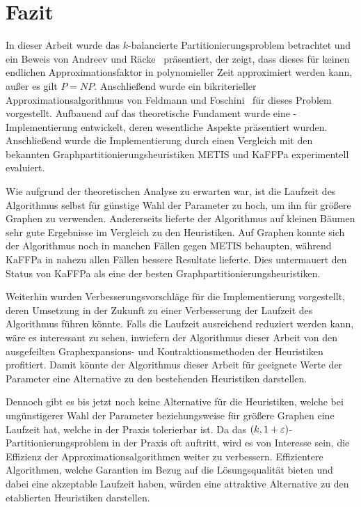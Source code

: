 
\chapter{Fazit}\label{chapter:fazit}
In dieser Arbeit wurde das $k$\hyp balancierte Partitionierungsproblem betrachtet und ein Beweis von Andreev und Räcke~\cite{ar06} präsentiert, der zeigt, dass dieses für keinen endlichen Approximationsfaktor in polynomieller Zeit approximiert werden kann, außer es gilt $P=NP$.
Anschließend wurde ein bikriterieller Approximationsalgorithmus von Feldmann und Foschini~\cite{FF15} für dieses Problem vorgestellt.
Aufbauend auf das theoretische Fundament wurde eine \Cpp{}\hyp Implementierung entwickelt, deren wesentliche Aspekte präsentiert wurden.
Anschließend wurde die Implementierung durch einen Vergleich mit den bekannten Graphpartitionierungsheuristiken METIS und KaFFPa experimentell evaluiert.

Wie aufgrund der theoretischen Analyse zu erwarten war, ist die Laufzeit des Algorithmus selbst für günstige Wahl der Parameter zu hoch, um ihn für größere Graphen zu verwenden.
Andererseits lieferte der Algorithmus auf kleinen Bäumen sehr gute Ergebnisse im Vergleich zu den Heuristiken.
Auf Graphen konnte sich der Algorithmus noch in manchen Fällen gegen METIS behaupten, während KaFFPa in nahezu allen Fällen bessere Resultate lieferte.
Dies untermauert den Status von KaFFPa als eine der besten Graphpartitionierungsheuristiken.

Weiterhin wurden Verbesserungsvorschläge für die Implementierung vorgestellt, deren Umsetzung in der Zukunft zu einer Verbesserung der Laufzeit des Algorithmus führen könnte.
Falls die Laufzeit ausreichend reduziert werden kann, wäre es interessant zu sehen, inwiefern der Algorithmus dieser Arbeit von den ausgefeilten Graphexpansions- und Kontraktionsmethoden der Heuristiken profitiert.
Damit könnte der Algorithmus dieser Arbeit für geeignete Werte der Parameter eine Alternative zu den bestehenden Heuristiken darstellen.

Dennoch gibt es bis jetzt noch keine Alternative für die Heuristiken, welche bei ungünstigerer Wahl der Parameter beziehungsweise für größere Graphen eine Laufzeit hat, welche in der Praxis tolerierbar ist.
Da das $(k,1+\varepsilon)$\hyp Partitionierungsproblem in der Praxis oft auftritt, wird es von Interesse sein, die Effizienz der Approximationsalgorithmen weiter zu verbessern.
Effizientere Algorithmen, welche Garantien im Bezug auf die Lösungsqualität bieten und dabei eine akzeptable Laufzeit haben, würden eine attraktive Alternative zu den etablierten Heuristiken darstellen. 
